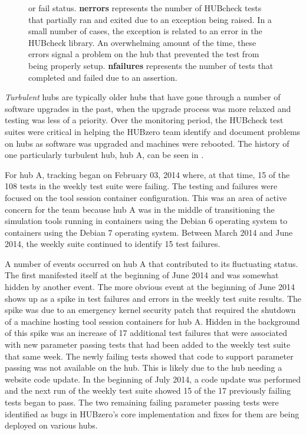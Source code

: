 \begin{figure}[ht!]
{                  or fail status. \textbf{nerrors} represents the number of
                  HUBcheck tests that partially ran and exited due to
                  an exception being raised. In a small number of cases,
                  the exception is related to an error in the HUBcheck
                  library. An overwhelming amount of the time, these errors
                  signal a problem on the hub that prevented the test
                  from being properly setup. \textbf{nfailures} represents the
                  number of tests that completed and failed due to an
                  assertion.
                  }
        \label{fig:hub_a_health_plots}
\end{figure}


\textit{Turbulent} hubs are typically older hubs that have gone through a
number of software upgrades in the past, when the upgrade process was more
relaxed and testing was less of a priority.  Over the monitoring period, the
HUBcheck test suites were critical in helping the HUBzero team identify and
document problems on hubs as software was upgraded and machines were rebooted.
The history of one particularly turbulent hub, hub A, can be seen in
.

For hub A, tracking began on February 03, 2014 where, at that time, 15 of the
108 tests in the weekly test suite were failing. The testing and failures were
focused on the tool session container configuration. This was an area of active
concern for the team because hub A was in the middle of transitioning the
simulation tools running in containers using the Debian 6 operating system to
containers using the Debian 7 operating system.  Between March 2014 and June
2014, the weekly suite continued to identify 15 test failures.


A number of events occurred on hub A that contributed to its fluctuating
status.  The first manifested itself at the beginning of June 2014 and was
somewhat hidden by another event. The more obvious event at the beginning of
June 2014 shows up as a spike in test failures and errors in the weekly test
suite results. The spike was due to an emergency kernel security patch that
required the shutdown of a machine hosting tool session containers for hub A.
Hidden in the background of this spike was an increase of 17 additional test
failures that were associated with new parameter passing tests that had been
added to the weekly test suite that same week. The newly failing tests showed
that code to support parameter passing was not available on the hub. This is
likely due to the hub needing a website code update.  In the beginning of July
2014, a code update was performed and the next run of the weekly test suite
showed 15 of the 17 previously failing tests began to pass. The two remaining
failing parameter passing tests were identified as bugs in HUBzero's core
implementation and fixes for them are being deployed on various hubs.


